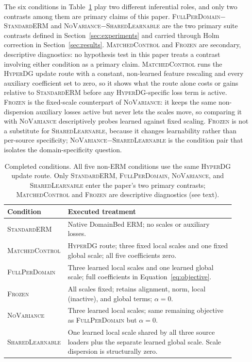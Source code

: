 \documentclass[10pt]{article}
\newcommand{\method}{\textsc{HyperDG}}
\newcommand{\full}{\textsc{FullPerDomain}}
\newcommand{\erm}{\textsc{StandardERM}}
\newcommand{\shared}{\textsc{SharedLearnable}}
\newcommand{\novar}{\textsc{NoVariance}}
\begin{document}
The six conditions in Table~\ref{tab:conditions} play two different
inferential roles, and only two contrasts among them are primary claims of
this paper. \full{}$-$\erm{} and \novar{}$-$\shared{} are the two primary
suite contrasts defined in Section~\ref{sec:experiments} and carried through
Holm correction in Section~\ref{sec:results}. \textsc{MatchedControl} and
\textsc{Frozen} are secondary, descriptive diagnostics: no hypothesis test in
this paper treats a contrast involving either condition as a primary claim.
\textsc{MatchedControl} runs the \method{} update route with a constant,
non-learned feature rescaling and every auxiliary coefficient set to zero, so
it shows what the route alone costs or gains relative to \erm{} before any
\method{}-specific loss term is active. \textsc{Frozen} is the fixed-scale
counterpart of \novar{}: it keeps the same non-dispersion auxiliary losses
active but never lets the scales move, so comparing it with \novar{}
descriptively probes learned against fixed scaling. \textsc{Frozen} is not a
substitute for \shared{}, because it changes learnability rather than
per-source specificity; \novar{}$-$\shared{} is the condition pair that isolates
the domain-specificity question.
\begin{table}[!h]
\centering
\small
\caption{Completed conditions. All five non-ERM conditions use the same
\method{} update route. Only \erm{}, \full{}, \novar{}, and \shared{} enter the
paper's two primary contrasts; \textsc{MatchedControl} and \textsc{Frozen} are
descriptive diagnostics (see text).}
\label{tab:conditions}
\begin{tabular}{p{0.20\linewidth}p{0.73\linewidth}}
\toprule
Condition & Executed treatment \\
\midrule
\erm{} & Native DomainBed ERM; no scales or auxiliary losses. \\
\textsc{MatchedControl} & \method{} route; three fixed local scales and one fixed
global scale; all five coefficients zero. \\
\full{} & Three learned local scales and one learned global scale; full
coefficients in Equation~\ref{eq:objective}. \\
\textsc{Frozen} & All scales fixed; retains alignment, norm, local (inactive),
and global terms; $\alpha=0$. \\
\novar{} & Three learned local scales; same remaining objective as \full{} but
$\alpha=0$. \\
\shared{} & One learned local scale shared by all three source loaders plus the
separate learned global scale. Scale dispersion is structurally zero. \\
\bottomrule
\end{tabular}
\end{table}
\FloatBarrier
\end{document}
